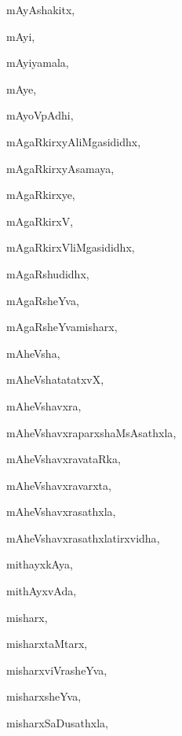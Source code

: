 \begin{multicols}{3}
{\noindent
{mAyAshakitx}, \pageref{mAyAshakitx}

\noindent
{mAyi}, \pageref{mAyi}

\noindent
{mAyiyamala}, \pageref{mAyiyamala}

\noindent
{mAye}, \pageref{mAye}

\noindent
{mAyoVpAdhi}, \pageref{mAyoVpAdhi}

\noindent
{mAgaRkirxyAliMgasididhx}, \pageref{mAgaRkirxyAliMgasididhx}

\noindent
{mAgaRkirxyAsamaya}, \pageref{mAgaRkirxyAsamaya}

\noindent
{mAgaRkirxye}, \pageref{mAgaRkirxye}

\noindent
{mAgaRkirxV}, \pageref{mAgaRkirxV}

\noindent
{mAgaRkirxVliMgasididhx}, \pageref{mAgaRkirxVliMgasididhx}

\noindent
{mAgaRshudidhx}, \pageref{mAgaRshudidhx}

\noindent
{mAgaRsheYva}, \pageref{mAgaRsheYva}

\noindent
{mAgaRsheYvamisharx}, \pageref{mAgaRsheYvamisharx}

\noindent
{mAheVsha}, \pageref{mAheVsha}

\noindent
{mAheVshatatatxvX}, \pageref{mAheVshatatatxvX}

\noindent
{mAheVshavxra}, \pageref{mAheVshavxra}

\noindent
{mAheVshavxraparxshaMsAsathxla}, \pageref{mAheVshavxraparxshaMsAsathxla}

\noindent
{mAheVshavxravataRka}, \pageref{mAheVshavxravataRka}

\noindent
{mAheVshavxravarxta}, \pageref{mAheVshavxravarxta}

\noindent
{mAheVshavxrasathxla}, \pageref{mAheVshavxrasathxla}

\noindent
{mAheVshavxrasathxlatirxvidha}, \pageref{mAheVshavxrasathxlatirxvidha}

\noindent
{mithayxkAya}, \pageref{mithayxkAya}

\noindent
{mithAyxvAda}, \pageref{mithAyxvAda}

\noindent
{misharx}, \pageref{misharx}

\noindent
{misharxtaMtarx}, \pageref{misharxtaMtarx}

\noindent
{misharxviVrasheYva}, \pageref{misharxviVrasheYva}

\noindent
{misharxsheYva}, \pageref{misharxsheYva}

\noindent
{misharxSaDusathxla,}

}
\end{multicols}
